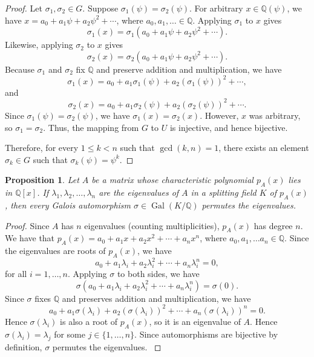 \documentclass{article}
\DeclareMathOperator{\Gal}{Gal}
\newtheorem{proposition}{Proposition}
\begin{document}
\begin{proof}
        Let $\sigma_1,\sigma_2\in G$. Suppose $\sigma_1(\psi) = \sigma_2(\psi)$. For arbitrary $x \in \mathbb{Q}(\psi)$, we have $x = a_0+a_1\psi+a_2\psi^2+\cdots$, where $a_0,a_1,\ldots\in\mathbb{Q}$. Applying $\sigma_1$ to $x$ gives \[\sigma_1(x)=\sigma_1(a_0 + a_1\psi+a_2\psi^2+\cdots).\] Likewise, applying $\sigma_2$ to $x$ gives \[\sigma_2(x)=\sigma_2(a_0 + a_1\psi+a_2\psi^2+\cdots).\] Because $\sigma_1$ and $\sigma_2$ fix $\mathbb{Q}$ and preserve addition and multiplication, we have \[\sigma_1(x) = a_0 + a_1\sigma_1(\psi) + a_2(\sigma_1(\psi))^2+\cdots,\] and \[\sigma_2(x) = a_0 + a_1\sigma_2(\psi) + a_2(\sigma_2(\psi))^2+\cdots.\] Since $\sigma_1(\psi)=\sigma_2(\psi)$, we have $\sigma_1(x)=\sigma_2(x)$. However, $x$ was arbitrary, so $\sigma_1=\sigma_2$. Thus, the mapping from $G$ to $U$ is injective, and hence bijective.
        
        Therefore, for every $1\le k < n$ such that $\gcd(k,n)=1$, there exists an element $\sigma_k\in G$ such that $\sigma_k(\psi)=\psi^k$.
    \end{proof}

    \begin{proposition}
        Let $A$ be a matrix whose characteristic polynomial $p_A(x)$ lies in $\mathbb{Q}[x]$. If $\lambda_1,\lambda_2,\ldots,\lambda_n$ are the eigenvalues of $A$ in a splitting field $K$ of $p_A(x)$, then every Galois automorphism $\sigma\in\Gal(K/\mathbb{Q})$ permutes the eigenvalues. \label{prop:galoispermuteeigs}
    \end{proposition}

    \begin{proof}
        Since $A$ has $n$ eigenvalues (counting multiplicities), $p_A(x)$ has degree $n$. We have that $p_A(x)=a_0+a_1x+a_2x^2+\cdots+a_nx^n$, where $a_0, a_1, \ldots a_n\in\mathbb{Q}$. Since the eigenvalues are roots of $p_A(x)$, we have \[a_0+a_1\lambda_i+a_2\lambda_i^2+\cdots+a_n\lambda_i^n=0,\] for all $i = 1,\ldots, n$. Applying $\sigma$ to both sides, we have \[\sigma(a_0+a_1\lambda_i+a_2\lambda_i^2+\cdots+a_n\lambda_i^n)=\sigma(0).\] Since $\sigma$ fixes $\mathbb{Q}$ and preserves addition and multiplication, we have \[a_0+a_1\sigma(\lambda_i)+a_2(\sigma(\lambda_i))^2+\cdots+a_n(\sigma(\lambda_i))^n=0.\] Hence $\sigma(\lambda_i)$ is also a root of $p_A(x)$, so it is an eigenvalue of $A$. Hence $\sigma(\lambda_i)=\lambda_j$ for some $j\in\{1,\ldots,n\}$. Since automorphisms are bijective by definition, $\sigma$ permutes the eigenvalues. \cite{conrad}
    \end{proof}
\end{document}
